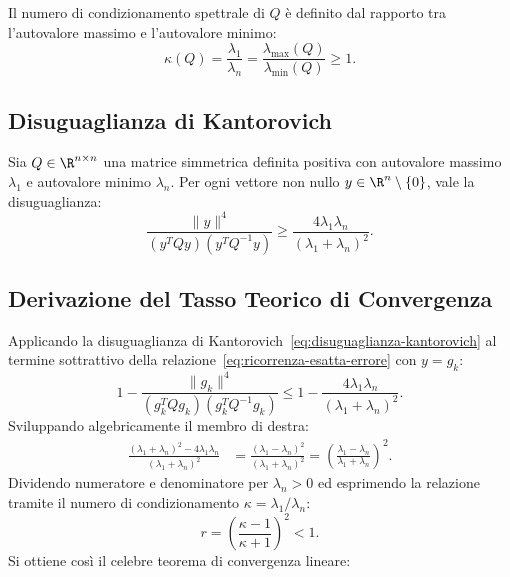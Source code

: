 \begin{definition}
Il numero di condizionamento spettrale di $Q$ \`e definito dal rapporto tra l'autovalore massimo e l'autovalore minimo:
\begin{equation}
    \kappa(Q) = \frac{\lambda_1}{\lambda_n} = \frac{\lambda_{\max}(Q)}{\lambda_{\min}(Q)} \ge 1.
\end{equation}
\end{definition}

\subsection{Disuguaglianza di Kantorovich}

\begin{theorem}
\label{thm:kantorovich}
Sia $Q \in \R^{n \times n}$ una matrice simmetrica definita positiva con autovalore massimo $\lambda_1$ e autovalore minimo $\lambda_n$. Per ogni vettore non nullo $y \in \R^n \setminus \{0\}$, vale la disuguaglianza:
\begin{equation}
    \frac{\|y\|^4}{(y^T Q y)(y^T Q^{-1} y)} \ge \frac{4 \lambda_1 \lambda_n}{(\lambda_1 + \lambda_n)^2}.
    \label{eq:disuguaglianza-kantorovich}
\end{equation}
\end{theorem}

\subsection{Derivazione del Tasso Teorico di Convergenza}
Applicando la disuguaglianza di Kantorovich~\eqref{eq:disuguaglianza-kantorovich} al termine sottrattivo della relazione~\eqref{eq:ricorrenza-esatta-errore} con $y = g_k$:
\begin{equation}
    1 - \frac{\|g_k\|^4}{(g_k^T Q g_k)(g_k^T Q^{-1} g_k)} \le 1 - \frac{4 \lambda_1 \lambda_n}{(\lambda_1 + \lambda_n)^2}.
\end{equation}
Sviluppando algebricamente il membro di destra:
\begin{align}
    \frac{(\lambda_1 + \lambda_n)^2 - 4 \lambda_1 \lambda_n}{(\lambda_1 + \lambda_n)^2} &= \frac{(\lambda_1 - \lambda_n)^2}{(\lambda_1 + \lambda_n)^2} = \left( \frac{\lambda_1 - \lambda_n}{\lambda_1 + \lambda_n} \right)^2.
\end{align}
Dividendo numeratore e denominatore per $\lambda_n > 0$ ed esprimendo la relazione tramite il numero di condizionamento $\kappa = \lambda_1 / \lambda_n$:
\begin{equation}
    r = \left( \frac{\kappa - 1}{\kappa + 1} \right)^2 < 1.
    \label{eq:tasso-kantorovich}
\end{equation}
Si ottiene cos\`i il celebre teorema di convergenza lineare:

